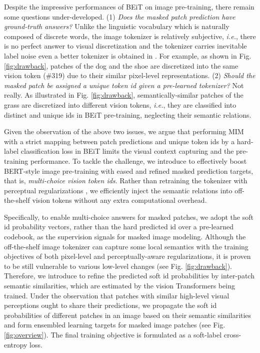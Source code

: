 \documentclass[runningheads]{llncs}
\begin{document}
Despite the impressive performances of BEiT on image pre-training, there remain some questions under-developed. 
(1) \textit{Does the masked patch prediction have ground-truth answers?} 
Unlike the linguistic vocabulary which is naturally composed of discrete words, the image tokenizer is relatively subjective,
\textit{i.e.}, there is no perfect answer to visual discretization and the tokenizer carries inevitable label noise even a better tokenizer is obtained in \cite{taming}.
For example, as shown in Fig. \ref{fig:drawback}, patches of the dog and the shoe are discretized into the same vision token (\#319) due to their similar pixel-level representations.
(2) \textit{Should the masked patch be assigned a unique token id given a pre-learned tokenizer?} 
Not really. 
As illustrated in Fig. \ref{fig:drawback}, semantically-similar patches of the grass are discretized into different vision tokens,
\textit{i.e.}, they are classified into distinct and unique ids in BEiT pre-training, neglecting their semantic relations.


Given the observation of the above two issues, we argue that performing MIM with a strict mapping between patch predictions and unique token ids by a hard-label classification loss in BEiT limits the visual context capturing and the pre-training performance. 
To tackle the challenge, we introduce to effectively boost BERT-style image pre-training with eased and refined masked prediction targets, that is, 
\textit{multi-choice vision token ids}.
Rather than retraining the tokenizer with perceptual regularizations \cite{peco,ibot}, 
we efficiently inject the semantic relations into off-the-shelf vision tokens without any extra computational overhead. 



Specifically, to enable multi-choice answers for masked patches, we adopt the soft id probability vectors, rather than the hard predicted id over a pre-learned codebook, as the supervision signals for masked image modeling.
Although the off-the-shelf image tokenizer \cite{taming} can capture some local semantics with the training objectives of both pixel-level and perceptually-aware regularizations, it is proven to be still vulnerable to various low-level changes (see Fig. \ref{fig:drawback}). 
Therefore, we introduce to refine the predicted soft id probabilities by inter-patch semantic similarities, which are estimated by the vision Transformers being trained.
Under the observation that patches with similar high-level visual perceptions ought to share their predictions, we propagate the soft id probabilities of different patches in an image based on their semantic similarities and form ensembled learning targets for masked image patches (see Fig. \ref{fig:overview}).
The final training objective is formulated as a soft-label cross-entropy loss.
\end{document}
